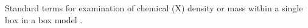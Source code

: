 \label{fig:boxModel}
Standard terms for examination of chemical (X) density or mass within a single box in a box model \cite{Jacob_1999_book}.